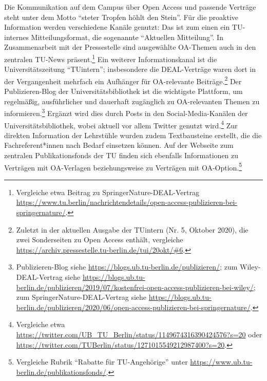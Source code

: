 \documentclass[a4paper,
fontsize=11pt,
oneside,
numbers=noperiodatend,
parskip=half-,
bibliography=totoc,
final
]{scrartcl}
\begin{document}
Die Kommunikation auf dem Campus über Open Access und passende Verträge
steht unter dem Motto \enquote{steter Tropfen höhlt den Stein}. Für die
proaktive Information werden verschiedene Kanäle genutzt: Das ist zum
einen ein TU-internes Mitteilungsformat, die sogenannte
\enquote{Aktuellen Mitteilung}. In Zusammenarbeit mit der Pressestelle
sind ausgewählte OA-Themen auch in den zentralen TU-News
präsent.\footnote{Vergleiche etwa Beitrag zu SpringerNature-DEAL-Vertrag
  \url{https://www.tu.berlin/nachrichtendetails/open-access-publizieren-bei-springernature/}.}
Ein weiterer Informationskanal ist die Universitätszeitung
\enquote{TUintern}; insbesondere die DEAL-Verträge waren dort in der
Vergangenheit mehrfach ein Aufhänger für OA-relevante
Beiträge.\footnote{Zuletzt in der aktuellen Ausgabe der TUintern (Nr. 5,
  Oktober 2020), die zwei Sonderseiten zu Open Access enthält,
  vergleiche
  \url{https://archiv.pressestelle.tu-berlin.de/tui/20okt/\#6}.} Der
Publizieren-Blog der Universitätsbibliothek ist die wichtigste
Plattform, um regelmäßig, ausführlicher und dauerhaft zugänglich zu
OA-relevanten Themen zu informieren.\footnote{Publizieren-Blog siehe
  \url{https://blogs.ub.tu-berlin.de/publizieren/}; zum
  Wiley-DEAL-Vertrag siehe
  \url{https://blogs.ub.tu-berlin.de/publizieren/2019/07/kostenfrei-open-access-publizieren-bei-wiley/};
  zum SpringerNature-DEAL-Vertrag siehe
  \url{https://blogs.ub.tu-berlin.de/publizieren/2020/06/open-access-publizieren-bei-springernature/}.}
Ergänzt wird dies durch Posts in den Social-Media-Kanälen der
Universitätsbibliothek, wobei aktuell vor allem Twitter genutzt
wird.\footnote{Vergleiche etwa
  \url{https://twitter.com/UB_TU_Berlin/status/1149674316390424576?s=20}
  oder
  \url{https://twitter.com/TUBerlin/status/1271015549212987400?s=20}.}
Zur direkten Information der Lehrstühle wurden zudem Textbausteine
erstellt, die die Fachreferent*innen nach Bedarf einsetzen können. Auf
der Webseite zum zentralen Publikationsfonds der TU finden sich
ebenfalls Informationen zu Verträgen mit OA-Verlagen beziehungsweise zu
Verträgen mit OA-Option.\footnote{Vergleiche Rubrik \enquote{Rabatte für
  TU-Angehörige} unter
  \url{https://www.ub.tu-berlin.de/publikationsfonds/}.}
\end{document}
